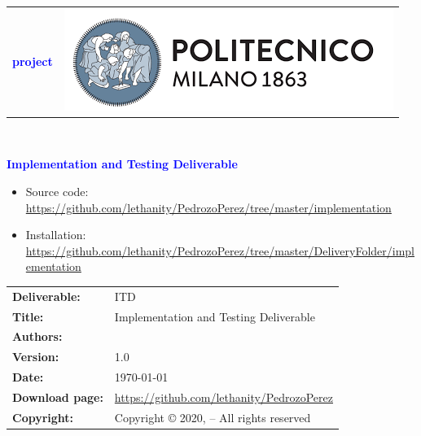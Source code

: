 




\begin{titlepage}



{\begin{table}[t!]
\centering
\begin{tabu} to \textwidth { X[1.3,r,p] X[1.7,l,p] }
\textcolor{Blue}
{\textbf{\small{\projectName{} project \newline \names{}}}} & \includegraphics[scale=0.5]{Images/PolimiLogo}
\end{tabu}
\end{table}}~\\ [7cm]


\begin{flushleft}

{\textcolor{Blue}{\textbf{\Huge{Implementation and Testing Deliverable}}}} \\ [1cm]

\end{flushleft}

\vspace{9cm}
\begin{itemize}[label={{}}]  \itemsep0em
        \item Source code: \url{https://github.com/lethanity/PedrozoPerez/tree/master/implementation}
        \item Installation: \url{https://github.com/lethanity/PedrozoPerez/tree/master/DeliveryFolder/implementation}
\end{itemize}

\end{titlepage}

\begin{table}[h!]
\begin{tabu} to \textwidth { X[0.3,r,p] X[0.7,l,p] }
\hline

\textbf{Deliverable:} & ITD\\
\textbf{Title:} & Implementation and Testing Deliverable \\
\textbf{Authors:} & \names{} \\
\textbf{Version:} & 1.0 \\ 
\textbf{Date:} & \today \\
\textbf{Download page:} & \url{https://github.com/lethanity/PedrozoPerez} \\
\textbf{Copyright:} & Copyright © 2020, \names{}  – All rights reserved \\
\hline
\end{tabu}
\end{table}




